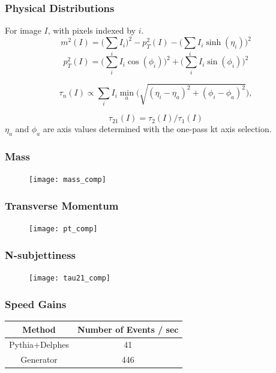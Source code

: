 \documentclass{beamer}
\begin{document}
	\begin{frame}
		\frametitle{Physical Distributions}
		For image $I$, with pixels indexed by $i$.
		$$
		m^2(I) = \bigg(\sum_i I_i\bigg)^2 -p^2_T(I) - \bigg(\sum_i I_i \sinh(\eta_i)\bigg)^2
		$$
		$$
		p_T^2(I) = \bigg(\sum_i I_i \cos(\phi_i)\bigg)^2 + \bigg(\sum_i I_i \sin(\phi_i)\bigg)^2
		$$
		
		
		$$
		\tau_n (I) \propto \sum_i I_i \min_a \bigg(\sqrt{(\eta_i - \eta_a)^2 + (\phi_i - \phi_a)^2}\bigg),
		$$
		
		$$
		\tau_{21} (I) = \tau_2 (I) / \tau_1 (I)
		$$
		$\eta_a$ and $\phi_a$ are axis values determined with the one-pass kt axis selection.
		
	\end{frame}
	
	\begin{frame}
		\frametitle{Mass}
		\begin{figure}[H]
			\centering
			\texttt{[image: mass\_comp]}
			
		\end{figure}
	\end{frame}

	\begin{frame}
		\frametitle{Transverse Momentum}
		\begin{figure}[H]
			\centering
			\texttt{[image: pt\_comp]}
			
		\end{figure}
	\end{frame}

	\begin{frame}
		\frametitle{N-subjettiness}
		\begin{figure}[H]
			\centering
			\texttt{[image: tau21\_comp]}
			
		\end{figure}
	\end{frame}

	\begin{frame}
		\centering
		\frametitle{Speed Gains}
			\begin{tabular}{cc}
			\toprule Method  & Number of Events / sec \\
			\midrule Pythia+Delphes  & 41\\
			\midrule Generator  & 446\\

			\bottomrule
		\end{tabular}
	\end{frame}

	
	
	

	
	
	
\end{document}
